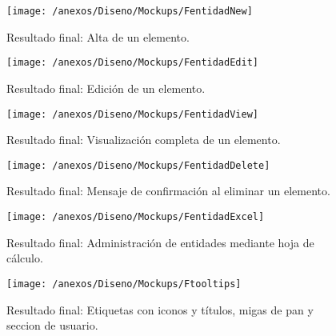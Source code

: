 \begin{figure}[h]
	\centering
	\texttt{[image: /anexos/Diseno/Mockups/FentidadNew]}
	\caption{Resultado final: Alta de un elemento.}
	\label{img:FentidadNew}
\end{figure}

\begin{figure}[h]
	\centering
	\texttt{[image: /anexos/Diseno/Mockups/FentidadEdit]}
	\caption{Resultado final: Edición de un elemento.}
	\label{img:FentidadEdit}
\end{figure}

\begin{figure}[h]
	\centering
	\texttt{[image: /anexos/Diseno/Mockups/FentidadView]}
	\caption{Resultado final: Visualización completa de un elemento.}
	\label{img:FentidadView}
\end{figure}

\begin{figure}[h]
	\centering
	\texttt{[image: /anexos/Diseno/Mockups/FentidadDelete]}
	\caption{Resultado final: Mensaje de confirmación al eliminar un elemento.}
	\label{img:FentidadDelete}
\end{figure}

\begin{figure}[h]
	\centering
	\texttt{[image: /anexos/Diseno/Mockups/FentidadExcel]}
	\caption{Resultado final: Administración de entidades mediante hoja de cálculo.}
	\label{img:FentidadExcel}
\end{figure}

\begin{figure}[h]
	\centering
	\texttt{[image: /anexos/Diseno/Mockups/Ftooltips]}
	\caption{Resultado final: Etiquetas con iconos y títulos, migas de pan y seccion de usuario.}
	\label{img:Ftooltips}
\end{figure}